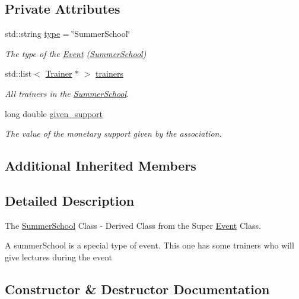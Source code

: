 \subsection*{Private Attributes}
\begin{DoxyCompactItemize}
\item 
std\+::string \mbox{\hyperlink{classSummerSchool_a4bce94c462b492844cacce921427d212}{type}} = \char`\"{}Summer\+School\char`\"{}
\begin{DoxyCompactList}\small\item\em The type of the \mbox{\hyperlink{classEvent}{Event}} (\mbox{\hyperlink{classSummerSchool}{Summer\+School}}) \end{DoxyCompactList}\item 
std\+::list$<$ \mbox{\hyperlink{classTrainer}{Trainer}} $\ast$ $>$ \mbox{\hyperlink{classSummerSchool_a3208a977c13ce8d7415b179a040efae3}{trainers}}
\begin{DoxyCompactList}\small\item\em All trainers in the \mbox{\hyperlink{classSummerSchool}{Summer\+School}}. \end{DoxyCompactList}\item 
long double \mbox{\hyperlink{classSummerSchool_a7e6899945d6a486e9d1d1f581236630b}{given\+\_\+support}}
\begin{DoxyCompactList}\small\item\em The value of the monetary support given by the association. \end{DoxyCompactList}\end{DoxyCompactItemize}
\subsection*{Additional Inherited Members}


\subsection{Detailed Description}
The \mbox{\hyperlink{classSummerSchool}{Summer\+School}} Class -\/ Derived Class from the Super \mbox{\hyperlink{classEvent}{Event}} Class. 

A summer\+School is a special type of event. This one has some trainers who will give lectures during the event 

\subsection{Constructor \& Destructor Documentation}
\mbox{\label{classSummerSchool_af66df445834a36ccb6e67d5503c1b776}} 
